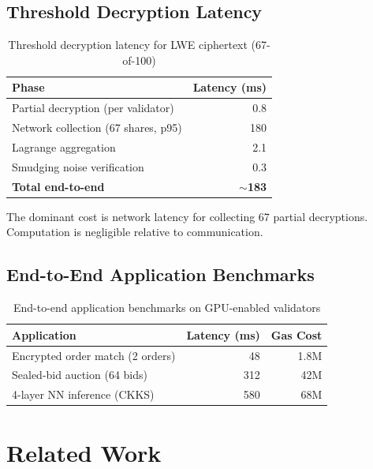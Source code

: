 \documentclass[11pt,letterpaper]{article}
\theoremstyle{definition}
\theoremstyle{remark}
\begin{document}
\subsection{Threshold Decryption Latency}

\begin{table}[h]
\centering
\begin{tabular}{lr}
\toprule
\textbf{Phase} & \textbf{Latency (ms)} \\
\midrule
Partial decryption (per validator) & 0.8 \\
Network collection (67 shares, p95) & 180 \\
Lagrange aggregation & 2.1 \\
Smudging noise verification & 0.3 \\
\textbf{Total end-to-end} & \textbf{$\sim$183} \\
\bottomrule
\end{tabular}
\caption{Threshold decryption latency for LWE ciphertext (67-of-100)}
\label{tab:threshold}
\end{table}

The dominant cost is network latency for collecting 67 partial decryptions. Computation is negligible relative to communication.

\subsection{End-to-End Application Benchmarks}

\begin{table}[h]
\centering
\begin{tabular}{lrr}
\toprule
\textbf{Application} & \textbf{Latency (ms)} & \textbf{Gas Cost} \\
\midrule
Encrypted order match (2 orders) & 48 & 1.8M \\
Sealed-bid auction (64 bids) & 312 & 42M \\
4-layer NN inference (CKKS) & 580 & 68M \\
\bottomrule
\end{tabular}
\caption{End-to-end application benchmarks on GPU-enabled validators}
\label{tab:e2e}
\end{table}

\section{Related Work}
\label{sec:related}
\end{document}

